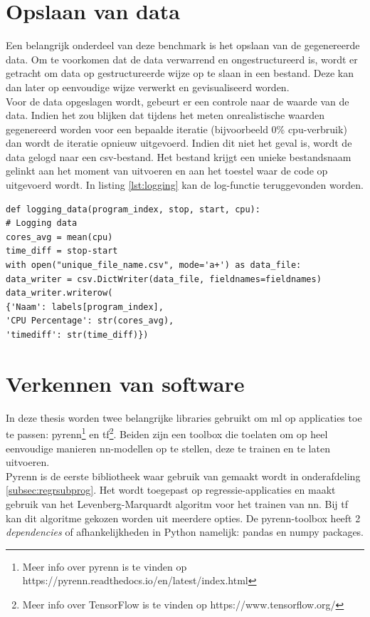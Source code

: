 \section{Opslaan van data}
Een belangrijk onderdeel van deze benchmark is het opslaan van de gegenereerde data. Om te voorkomen dat de data verwarrend en ongestructureerd is, wordt er getracht om data op gestructureerde wijze op te slaan in een bestand. Deze kan dan later op eenvoudige wijze verwerkt en gevisualiseerd worden. \\
Voor de data opgeslagen wordt, gebeurt er een controle naar de waarde van de data. Indien het zou blijken dat tijdens het meten onrealistische waarden gegenereerd worden voor een bepaalde iteratie (bijvoorbeeld 0\% \gls{cpu}-verbruik) dan wordt de iteratie opnieuw uitgevoerd. Indien dit niet het geval is, wordt de data gelogd naar een \gls{csv}-bestand. Het bestand krijgt een unieke bestandsnaam gelinkt aan het moment van uitvoeren en aan het toestel waar de code op uitgevoerd wordt. In listing \ref{lst:logging} kan de log-functie teruggevonden worden.


\begin{lstlisting}[caption={Opslaan van de gewenste data.}, captionpos=b,label={lst:logging}]
def logging_data(program_index, stop, start, cpu):
# Logging data
cores_avg = mean(cpu)
time_diff = stop-start
with open("unique_file_name.csv", mode='a+') as data_file:
data_writer = csv.DictWriter(data_file, fieldnames=fieldnames)
data_writer.writerow(
{'Naam': labels[program_index],
'CPU Percentage': str(cores_avg),
'timediff': str(time_diff)})
\end{lstlisting}	


\section{Verkennen van software}

In deze thesis worden twee belangrijke libraries gebruikt om \gls{ml} op applicaties toe te passen: pyrenn\footnote{Meer info over pyrenn is te vinden op https://pyrenn.readthedocs.io/en/latest/index.html } en \gls{tf}\footnote{Meer info over TensorFlow is te vinden op https://www.tensorflow.org/ }. Beiden zijn een toolbox die toelaten om op heel eenvoudige manieren \gls{nn}-modellen op te stellen,  deze te trainen en te laten uitvoeren. \\
Pyrenn is de eerste bibliotheek waar gebruik van gemaakt wordt in onderafdeling \ref{subsec:regrsubprog}. Het wordt toegepast op regressie-applicaties en maakt gebruik van het Levenberg-Marquardt algoritm voor het trainen van \gls{nn}. Bij \gls{tf} kan dit algoritme gekozen worden uit meerdere opties. De pyrenn-toolbox heeft 2 \textit{dependencies} of afhankelijkheden in Python namelijk: pandas en numpy packages. \\

